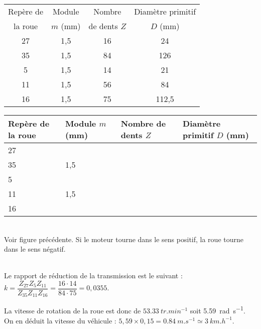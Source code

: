 \begin{center}
\begin{tabular}{cccc}
\hline
Repère de  & Module  & Nombre & Diamètre primitif  \\
la roue & $m$ (mm) & de dents $Z$ & $D$ (mm) \\
\hline
27 & 1,5 &16 & 24\\ 
35 & 1,5 &84 & 126\\ 
5   &1,5 &14 & 21\\ 
11 & 1,5 & 56 & 84 \\ 
16 &  1,5&  75& 112,5\\ \hline
\end{tabular}
\end{center}
\else
\begin{center}
\begin{tabular}{llll}
\hline
Repère de la roue & Module  $m$ (mm) & Nombre de dents $Z$& Diamètre primitif $D$ (mm) \\
\hline
27 & & & \\ 
35 & 1,5& & \\
5& & & \\ 
11& 1,5 & & \\ 16& & & \\ \hline
\end{tabular}
\end{center}
\fi


\ifprof ~\\
Voir figure précédente. Si le moteur tourne dans le sens positif, la roue tourne dans le sens négatif. 
\else
\fi

\ifprof ~\\
Le rapport de réduction de la transmission est le suivant : 
$k=\dfrac{Z_{27} Z_{5} Z_{11} }{Z_{35} Z_{11} Z_{16}} = \dfrac{16\cdot 14}{84\cdot 75} =0,0355 $.

La vitesse de rotation de la roue est donc de $\SI{53,33}{tr.min^{-1}}$ soit \SI{5,59}{rad.s^{-1}}. 
On en déduit la vitesse du véhicule : $5,59 \times 0,15 = \SI{0,84}{m.s^{-1}}\simeq \SI{3}{km.h^{-1}}$.

\else
\fi

\ifprof
\else


\fi